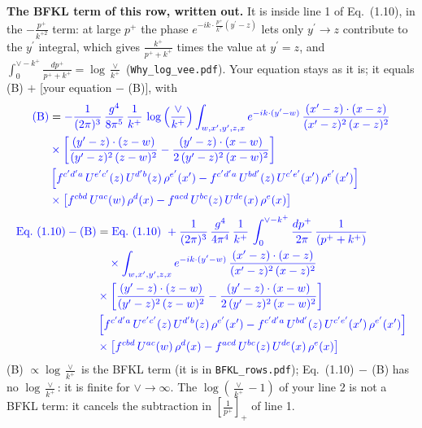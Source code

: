 \documentclass[9pt]{article}
\numberwithin{equation}{section}
\begin{document}
{\color{blue}\noindent\textbf{The BFKL term of this row, written out.} It is inside line 1 of Eq.~(1.10), in the $-\frac{p^+}{k^{+2}}$ term: at large $p^+$ the phase $e^{-ik\cdot\frac{p^+}{k^+}(y^\prime-z)}$ lets only $y^\prime\to z$ contribute to the $y^\prime$ integral, which gives $\frac{k^+}{p^++k^+}$ times the value at $y^\prime=z$, and $\int_0^{\vee-k^+}\frac{dp^+}{p^++k^+}=\log\frac{\vee}{k^+}$ (\texttt{Why\_log\_vee.pdf}). Your equation stays as it is; it equals (B) $+$ [your equation $-$ (B)], with}
\begin{align*}
{\color{blue}\text{(B)}} &= \color{blue}-\frac{1}{(2\pi)^{3}}\,\frac{g^{4}}{8\pi^{5}}\,\frac{1}{k^{+}}\,\log{\left(\frac{\vee}{k^{+}}\right)}\int_{w,x',y',z,x} e^{-ik\cdot (y'-w)}\,\frac{(x'-z)\cdot (x-z)}{(x'-z)^{2}\,(x-z)^{2}}\notag \\
& \color{blue}  \times\bigg[\frac{(y'-z)\cdot (z-w)}{(y'-z)^{2}\,(z-w)^{2}}-\frac{(y'-z)\cdot (x-w)}{2\,(y'-z)^{2}\,(x-w)^{2}}\bigg]\notag \\
& \color{blue}  \left[f^{c'd'a}\,U^{e'c'}(z)\,U^{d'b}(z)\,\rho^{e'}(x')-f^{c'd'a}\, U^{bd'}(z)\,U^{c'e'}(x')\,\rho^{e'}(x')\right]\notag \\
& \color{blue}  \times\left[f^{cbd}\,U^{ac}(w)\,\rho^{d}(x) -f^{acd}\,U^{bc}(z)\,U^{de}(x)\,\rho^{e}(x)\right]
\end{align*}
\begin{align*}
{\color{blue}\text{Eq.~(1.10)} - \text{(B)}} &= \color{blue}\text{Eq.~(1.10)}\ +\frac{1}{(2\pi)^{3}}\,\frac{g^{4}}{4\pi^{4}}\,\frac{1}{k^{+}}\,\int_{0}^{\vee-k^{+}}\frac{dp^{+}}{2\pi}\,\frac{1}{(p^{+}+k^{+})}\\ & \color{blue} \quad\times\int_{w,x',y',z,x} e^{-ik\cdot (y'-w)}\,\frac{(x'-z)\cdot (x-z)}{(x'-z)^{2}\,(x-z)^{2}}\notag \\
& \color{blue}  \times\bigg[\frac{(y'-z)\cdot (z-w)}{(y'-z)^{2}\,(z-w)^{2}}-\frac{(y'-z)\cdot (x-w)}{2\,(y'-z)^{2}\,(x-w)^{2}}\bigg]\notag \\
& \color{blue}  \left[f^{c'd'a}\,U^{e'c'}(z)\,U^{d'b}(z)\,\rho^{e'}(x')-f^{c'd'a}\, U^{bd'}(z)\,U^{c'e'}(x')\,\rho^{e'}(x')\right]\notag \\
& \color{blue}  \times\left[f^{cbd}\,U^{ac}(w)\,\rho^{d}(x) -f^{acd}\,U^{bc}(z)\,U^{de}(x)\,\rho^{e}(x)\right]
\end{align*}
{\color{blue}\noindent (B) $\propto\log\frac{\vee}{k^+}$ is the BFKL term (it is in \texttt{BFKL\_rows.pdf}); Eq.~(1.10)$\,-\,$(B) has no $\log\frac{\vee}{k^+}$: it is finite for $\vee\to\infty$. The $\log(\frac{\vee}{k^+}-1)$ of your line 2 is not a BFKL term: it cancels the subtraction in $\left[\frac{1}{p^+}\right]_+$ of line 1.}
\end{document}
